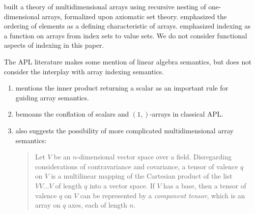 \cite{More1973} built a theory of multidimensional arrays using recursive
nesting of one-dimensional arrays, formalized upon axiomatic set theory.
\cite{Ghandour1973} emphasized the ordering of elements as a defining
characteristic of arrays. \cite{Gerth1988} emphasized indexing as a function on
arrays from index sets to value sets. We do not consider functional aspects of
indexing in this paper.

The APL literature makes some mention of linear algebra semantics, but does not
consider the interplay with array indexing semantics.

\begin{enumerate}
\item \cite{More1973} mentions the inner product returning a scalar as an
	important rule for guiding array semantics.

\item \cite{Haegi1976} bemoans the conflation of scalars and $(1,)$-arrays in
	classical APL.

\item \cite[p. 153]{More1973} also suggests the possibility of more complicated
	multidimensional array semantics:

\begin{quote}
Let $V$ be an $n$-dimensional vector space over a field. Disregarding
considerations of contravariance and covariance, a tensor of valence $q$ on $V$
is a multilinear mapping of the Cartesian product of the list $V V \dots V$ of
length $q$ into a vector space. If $V$ has a base, then a tensor of valence $q$
on $V$ can be represented by a \textit{component tensor}, which is an array on
$q$ axes, each of length $n$.
\end{quote}

\end{enumerate}

